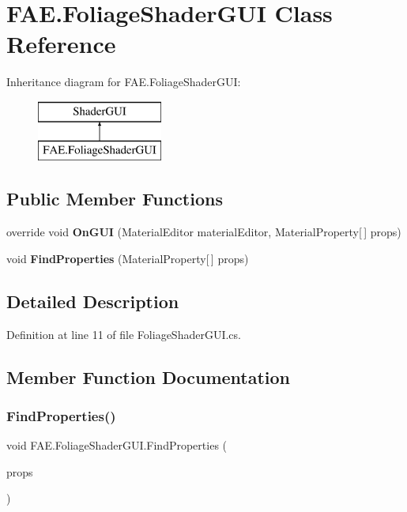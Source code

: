 \section{F\+A\+E.\+Foliage\+Shader\+G\+UI Class Reference}
\label{class_f_a_e_1_1_foliage_shader_g_u_i}
Inheritance diagram for F\+A\+E.\+Foliage\+Shader\+G\+UI\+:\begin{figure}[H]
\begin{center}
\leavevmode
\includegraphics[height=2.000000cm]{class_f_a_e_1_1_foliage_shader_g_u_i}
\end{center}
\end{figure}
\subsection*{Public Member Functions}
\begin{DoxyCompactItemize}
\item 
override void \textbf{ On\+G\+UI} (Material\+Editor material\+Editor, Material\+Property[$\,$] props)
\item 
void \textbf{ Find\+Properties} (Material\+Property[$\,$] props)
\end{DoxyCompactItemize}


\subsection{Detailed Description}


Definition at line 11 of file Foliage\+Shader\+G\+U\+I.\+cs.



\subsection{Member Function Documentation}
\mbox{\label{class_f_a_e_1_1_foliage_shader_g_u_i_a732d0f2f3ddd80befe25065bd17141ba}} 
\subsubsection{Find\+Properties()}
{\footnotesize\ttfamily void F\+A\+E.\+Foliage\+Shader\+G\+U\+I.\+Find\+Properties (\begin{DoxyParamCaption}\item[{Material\+Property [$\,$]}]{props }\end{DoxyParamCaption})}



